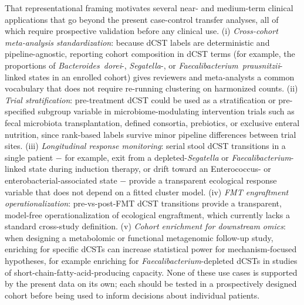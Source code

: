 \documentclass[
  11pt,
]{article}
\newcommand{\taxon}[1]{\emph{#1}}
\begin{document}
That representational framing motivates several near- and medium-term
clinical applications that go beyond the present case-control transfer
analyses, all of which require prospective validation before any
clinical use. (i) \emph{Cross-cohort meta-analysis standardization}:
because dCST labels are deterministic and pipeline-agnostic, reporting
cohort composition in dCST terms (for example, the proportions of
\taxon{Bacteroides~dorei}-, \taxon{Segatella}-, or
\taxon{Faecalibacterium~prausnitzii}-linked states in an enrolled
cohort) gives reviewers and meta-analysts a common vocabulary that does
not require re-running clustering on harmonized counts. (ii)
\emph{Trial stratification}: pre-treatment dCST could be used as a
stratification or pre-specified subgroup variable in
microbiome-modulating intervention trials such as fecal microbiota
transplantation, defined consortia, prebiotics, or exclusive enteral
nutrition, since rank-based labels survive minor pipeline differences
between trial sites. (iii) \emph{Longitudinal response monitoring}:
serial stool dCST transitions in a single patient \(-\) for example,
exit from a depleted-\taxon{Segatella} or
\taxon{Faecalibacterium}-linked state during induction therapy, or
drift toward an Enterococcus- or enterobacterial-associated state
\(-\) provide a transparent ecological response variable that does not
depend on a fitted cluster model. (iv) \emph{FMT engraftment
operationalization}: pre-vs-post-FMT dCST transitions provide a
transparent, model-free operationalization of ecological engraftment,
which currently lacks a standard cross-study definition. (v)
\emph{Cohort enrichment for downstream omics}: when designing a
metabolomic or functional metagenomic follow-up study, enriching for
specific dCSTs can increase statistical power for mechanism-focused
hypotheses, for example enriching for \taxon{Faecalibacterium}-depleted
dCSTs in studies of short-chain-fatty-acid-producing capacity. None of
these use cases is supported by the present data on its own; each
should be tested in a prospectively designed cohort before being used
to inform decisions about individual patients.
\end{document}
